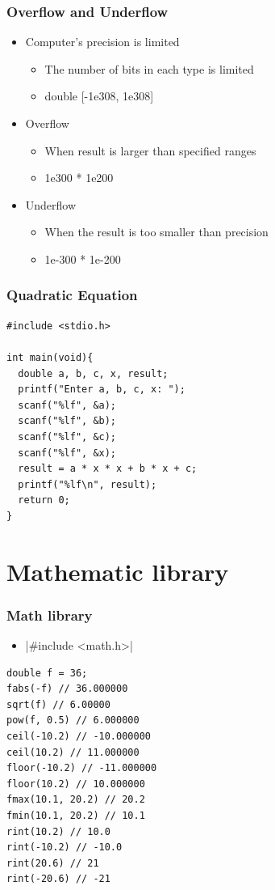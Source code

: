 \documentclass{../c-lecture}
\begin{document}
\begin{frame}
  \frametitle{Overflow and Underflow}
  \begin{itemize}
    \item Computer’s precision is limited
    \begin{itemize}
      \item
        {\color{Orange} The number of bits} in each type is
        limited
      \item double [-1e308, 1e308]
    \end{itemize}
    \item Overflow
    \begin{itemize}
      \item When result is larger than specified ranges
      \item 1e300 * 1e200
    \end{itemize}
    \item Underflow
    \begin{itemize}
      \item When the result is too smaller than precision
      \item 1e-300 * 1e-200
    \end{itemize}
  \end{itemize}
\end{frame}

\begin{frame}[fragile]
  \frametitle{Quadratic Equation}
  \begin{verbatim}
#include <stdio.h>

int main(void){
  double a, b, c, x, result;
  printf("Enter a, b, c, x: ");
  scanf("%lf", &a);
  scanf("%lf", &b);
  scanf("%lf", &c);
  scanf("%lf", &x);
  result = a * x * x + b * x + c;
  printf("%lf\n", result);
  return 0;
}
  \end{verbatim}
\end{frame}

\section{Mathematic library}

\begin{frame}[fragile]
  \frametitle{Math library}
  \begin{itemize}
    \item {}|#include <math.h>|
  \end{itemize}
  \begin{verbatim}
double f = 36;
fabs(-f) // 36.000000
sqrt(f) // 6.00000
pow(f, 0.5) // 6.000000
ceil(-10.2) // -10.000000
ceil(10.2) // 11.000000
floor(-10.2) // -11.000000
floor(10.2) // 10.000000
fmax(10.1, 20.2) // 20.2
fmin(10.1, 20.2) // 10.1
rint(10.2) // 10.0
rint(-10.2) // -10.0
rint(20.6) // 21
rint(-20.6) // -21
  \end{verbatim}
\end{frame}
\end{document}
